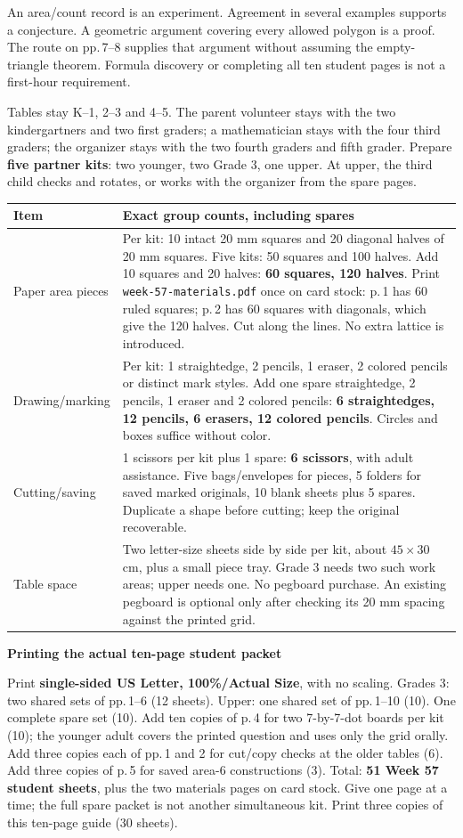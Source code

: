 \documentclass[letterpaper,11pt]{article}
\newcommand{\heading}[1]{\vspace{3pt}{\large\bfseries #1}\par}
\newcommand{\subhead}[1]{\vspace{2pt}\textbf{#1}\par}
\begin{document}
An area/count record is an experiment. Agreement in several examples supports a conjecture. A geometric argument covering every allowed polygon is a proof. The route on pp.\,7--8 supplies that argument without assuming the empty-triangle theorem. Formula discovery or completing all ten student pages is not a first-hour requirement.
\newpage

\heading{Preparation for eleven children and three anchored adults}
Tables stay K--1, 2--3 and 4--5. The parent volunteer stays with the two kindergartners and two first graders; a mathematician stays with the four third graders; the organizer stays with the two fourth graders and fifth grader. Prepare \textbf{five partner kits}: two younger, two Grade 3, one upper. At upper, the third child checks and rotates, or works with the organizer from the spare pages.


\begin{tabularx}{\linewidth}{@{}L{1.3in}X@{}}\toprule
Item & Exact group counts, including spares\\\midrule
Paper area pieces & Per kit: 10 intact 20 mm squares and 20 diagonal halves of 20 mm squares. Five kits: 50 squares and 100 halves. Add 10 squares and 20 halves: \textbf{60 squares, 120 halves}. Print \texttt{week-57-materials.pdf} once on card stock: p.\,1 has 60 ruled squares; p.\,2 has 60 squares with diagonals, which give the 120 halves. Cut along the lines. No extra lattice is introduced.\\
Drawing/marking & Per kit: 1 straightedge, 2 pencils, 1 eraser, 2 colored pencils or distinct mark styles. Add one spare straightedge, 2 pencils, 1 eraser and 2 colored pencils: \textbf{6 straightedges, 12 pencils, 6 erasers, 12 colored pencils}. Circles and boxes suffice without color.\\
Cutting/saving & 1 scissors per kit plus 1 spare: \textbf{6 scissors}, with adult assistance. Five bags/envelopes for pieces, 5 folders for saved marked originals, 10 blank sheets plus 5 spares. Duplicate a shape before cutting; keep the original recoverable.\\
Table space & Two letter-size sheets side by side per kit, about $45\times30$ cm, plus a small piece tray. Grade 3 needs two such work areas; upper needs one. No pegboard purchase. An existing pegboard is optional only after checking its 20 mm spacing against the printed grid.\\\bottomrule
\end{tabularx}


\subhead{Printing the actual ten-page student packet}
Print \textbf{single-sided US Letter, 100\%/Actual Size}, with no scaling. Grades 3: two shared sets of pp.\,1--6 (12 sheets). Upper: one shared set of pp.\,1--10 (10). One complete spare set (10). Add ten copies of p.\,4 for two 7-by-7-dot boards per kit (10); the younger adult covers the printed question and uses only the grid orally. Add three copies each of pp.\,1 and 2 for cut/copy checks at the older tables (6). Add three copies of p.\,5 for saved area-6 constructions (3). Total: \textbf{51 Week 57 student sheets}, plus the two materials pages on card stock. Give one page at a time; the full spare packet is not another simultaneous kit. Print three copies of this ten-page guide (30 sheets).
\end{document}
